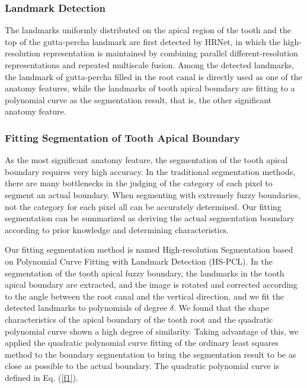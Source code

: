 \documentclass[journal]{IEEEtran}
\begin{document}
\subsubsection{Landmark Detection}
The landmarks uniformly distributed on the apical region of the tooth and the top of the gutta-percha landmark are first detected by HRNet\cite{wang2020deep,sun2019deep}, in which the high-resolution representation is maintained by combining parallel different-resolution representations and repeated multiscale fusion. Among the detected landmarks, the landmark of gutta-percha filled in the root canal is directly used as one of the anatomy features, while the landmarks of tooth apical boundary are fitting to a polynomial curve as the segmentation result, that is, the other significant anatomy feature.


\subsubsection{Fitting Segmentation of Tooth Apical Boundary}
As the most significant anatomy feature, the segmentation of the tooth apical boundary requires very high accuracy. In the traditional segmentation methods, there are many bottlenecks in the judging of the category of each pixel to segment an actual boundary. When segmenting with extremely fuzzy boundaries, not the category for each pixel all can be accurately determined. Our fitting segmentation can be summarized as deriving the actual segmentation boundary according to prior knowledge and determining characteristics.



Our fitting segmentation method is named High-resolution Segmentation based on Polynomial Curve Fitting with Landmark Detection (HS-PCL). In the segmentation of the tooth apical fuzzy boundary, the landmarks in the tooth apical boundary are extracted, and the image is rotated and corrected according to the angle between the root canal and the vertical direction, and we fit the detected landmarks to polynomials of degree $\delta$. We found that the shape characteristics of the apical boundary of the tooth root and the quadratic polynomial curve shown a high degree of similarity. Taking advantage of this, we applied the quadratic polynomial curve fitting of the ordinary least squares method\cite{hutcheson2011ordinary} to the boundary segmentation to bring the segmentation result to be as close as possible to the actual boundary. The quadratic polynomial curve is defined in Eq. (\ref{f1}).
\end{document}
